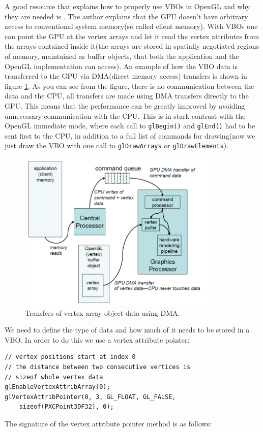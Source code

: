 \documentclass[]{article}
\begin{document}
A good resource that explains how to properly use VBOs in OpenGL and why they are needed is \cite{kilgard2009}. The author explains that the GPU doesn't have arbitrary access to conventional system memory(so called client memory). With VBOs one can point the GPU at the vertex arrays and let it read the vertex attributes from the arrays contained inside it(the arrays are stored in spatially negotiated regions of memory, maintained as buffer objects, that both the application and the OpenGL implementation can access). An example of how the VBO data is transferred to the GPU via DMA(direct memory access) transfers is shown in figure \ref{fig:VBOClientMemory}. As you can see from the figure, there is no communication between the data and the CPU, all transfers are made using DMA transfers directly to the GPU. This means that the performance can be greatly improved by avoiding unnecessary communication with the CPU. This is in stark contrast with the OpenGL immediate mode, where each call to \verb|glBegin()| and \verb|glEnd()| had to be sent first to the CPU, in addition to a full list of commands for drawing(now we just draw the VBO with one call to \verb|glDrawArrays| or \verb|glDrawElements|).
\begin{figure}[hbtp]
    \centering
    \includegraphics[width=0.85\textwidth]{figures/VBOClientMemory.PNG}
    \caption{Transfers of vertex array object data using DMA.}
    \label{fig:VBOClientMemory}
\end{figure}

We need to define the type of data and how much of it needs to be stored in a VBO. In order to do this we use a vertex attribute pointer:
\begin{verbatim}
// vertex positions start at index 0
// the distance between two consecutive vertices is
// sizeof whole vertex data
glEnableVertexAttribArray(0);
glVertexAttribPointer(0, 3, GL_FLOAT, GL_FALSE, 
    sizeof(PXCPoint3DF32), 0);
\end{verbatim}
The signature of the vertex attribute pointer method is as follows:
\end{document}
